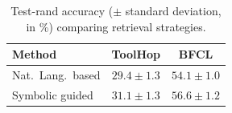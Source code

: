\begin{table}[t]
\small
\caption{Test-rand accuracy ($\pm$ standard deviation, in \%) comparing retrieval strategies.}
\vspace{0.5em}
\label{tab:retriever}
\centering
\renewcommand{\arraystretch}{1.25}
\begin{tabular}{@{}lcc@{}}
\toprule
\textbf{Method} & \textbf{ToolHop} & \textbf{BFCL} \\
\midrule
Nat.\ Lang.\ based 
& $29.4 \scriptstyle \pm 1.3$ 
& $54.1 \scriptstyle \pm 1.0$ \\
Symbolic guided 
& $\mathbf{31.1} \scriptstyle \pm 1.3$ 
& $\mathbf{56.6} \scriptstyle \pm 1.2$ \\
\bottomrule
\end{tabular}
\end{table}
